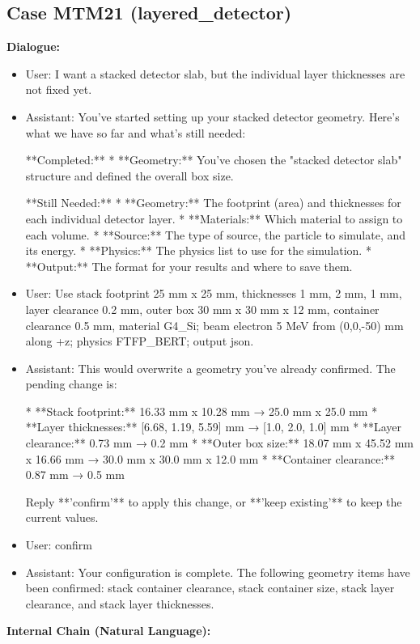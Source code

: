 \documentclass[11pt]{ctexart}
\begin{document}
\subsection{Case MTM21 (layered\_detector)}
\textbf{Dialogue:}
\begin{itemize}
\item User: I want a stacked detector slab, but the individual layer thicknesses are not fixed yet.
\item Assistant: You've started setting up your stacked detector geometry. Here's what we have so far and what's still needed:

**Completed:**
*   **Geometry:** You've chosen the "stacked detector slab" structure and defined the overall box size.

**Still Needed:**
*   **Geometry:** The footprint (area) and thicknesses for each individual detector layer.
*   **Materials:** Which material to assign to each volume.
*   **Source:** The type of source, the particle to simulate, and its energy.
*   **Physics:** The physics list to use for the simulation.
*   **Output:** The format for your results and where to save them.
\item User: Use stack footprint 25 mm x 25 mm, thicknesses 1 mm, 2 mm, 1 mm, layer clearance 0.2 mm, outer box 30 mm x 30 mm x 12 mm, container clearance 0.5 mm, material G4\_Si; beam electron 5 MeV from (0,0,-50) mm along +z; physics FTFP\_BERT; output json.
\item Assistant: This would overwrite a geometry you've already confirmed. The pending change is:

*   **Stack footprint:** 16.33 mm x 10.28 mm → 25.0 mm x 25.0 mm
*   **Layer thicknesses:** [6.68, 1.19, 5.59] mm → [1.0, 2.0, 1.0] mm
*   **Layer clearance:** 0.73 mm → 0.2 mm
*   **Outer box size:** 18.07 mm x 45.52 mm x 16.66 mm → 30.0 mm x 30.0 mm x 12.0 mm
*   **Container clearance:** 0.87 mm → 0.5 mm

Reply **'confirm'** to apply this change, or **'keep existing'** to keep the current values.
\item User: confirm
\item Assistant: Your configuration is complete. The following geometry items have been confirmed: stack container clearance, stack container size, stack layer clearance, and stack layer thicknesses.
\end{itemize}
\textbf{Internal Chain (Natural Language):}
\end{document}
